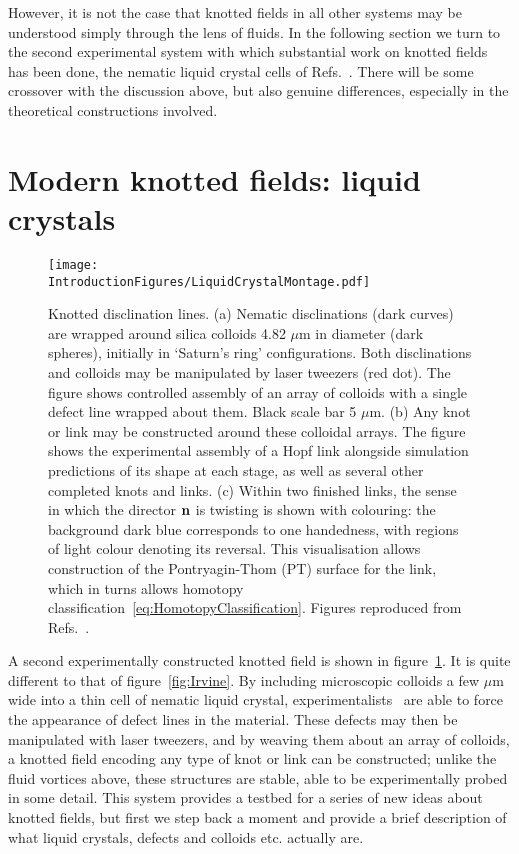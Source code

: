 However, it is not the case that knotted fields in all other systems may be understood simply through the lens of fluids. In the following section we turn to the second experimental system with which substantial work on knotted fields has been done, the nematic liquid crystal cells of Refs.~\citep{Tkalec2011,Tasinkevych2014,Copar2015}. There will be some crossover with the discussion above, but also genuine differences, especially in the theoretical constructions involved. 
\section{Modern knotted fields: liquid crystals}
\begin{figure}[htbp]
\centering
\texttt{[image: \\IntroductionFigures/LiquidCrystalMontage.pdf]}
\caption{Knotted disclination lines. (a) Nematic disclinations (dark curves) are wrapped around silica colloids 4.82 $\mu$m in diameter (dark spheres), initially in `Saturn's ring' configurations. Both disclinations and colloids may be manipulated by laser tweezers (red dot). The figure shows controlled assembly of an array of colloids with a single defect line wrapped about them. Black scale bar 5 $\mu$m. (b) Any knot or link may be constructed around these colloidal arrays. The figure shows the experimental assembly of a Hopf link alongside simulation predictions of its shape at each stage, as well as several other completed knots and links. (c) Within two finished links, the sense in which the director $\bf n$ is twisting is shown with colouring: the background dark blue corresponds to one handedness, with regions of light colour denoting its reversal. This visualisation allows construction of the Pontryagin-Thom (PT) surface for the link, which in turns allows homotopy classification~\eqref{eq:HomotopyClassification}. Figures reproduced from Refs.~\citep{Tkalec2011,Copar2015}.}
\label{fig:KnottedLiquidCrystal}
\end{figure}
A second experimentally constructed knotted field is shown in figure~\ref{fig:KnottedLiquidCrystal}. It is quite different to that of figure~\ref{fig:Irvine}. By including microscopic colloids a few $\mu$m wide into a thin cell of nematic liquid crystal, experimentalists~\citep{Tkalec2011,Tasinkevych2014,Copar2015} are able to force the appearance of defect lines in the material. These defects may then be manipulated with laser tweezers, and by weaving them about an array of colloids, a knotted field encoding any type of knot or link can be constructed; unlike the fluid vortices above, these structures are stable, able to be experimentally probed in some detail. This system provides a testbed for a series of new ideas about knotted fields, but first we step back a moment and provide a brief description of what liquid crystals, defects and colloids etc. actually are.

